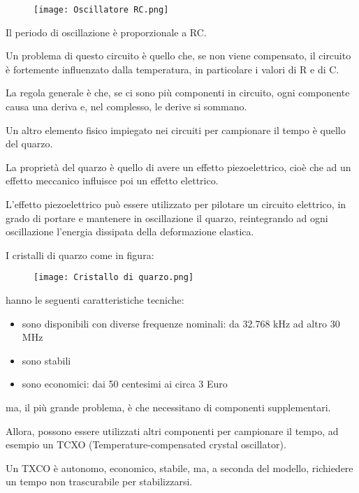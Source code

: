 \begin{figure}[h]
    \centering
    \texttt{[image: Oscillatore RC.png]}
\end{figure}

Il periodo di oscillazione è proporzionale a RC. \newline 

Un problema di questo circuito è quello che, se non viene compensato, 
il circuito è fortemente influenzato dalla temperatura, in particolare i valori di R e di C. \newline 

La regola generale è che, se ci sono più componenti in circuito, ogni componente causa una deriva e, nel complesso, 
le derive si sommano. \newline 

Un altro elemento fisico impiegato nei circuiti per campionare il tempo è quello del quarzo. \newline 

La proprietà del quarzo è quello di avere un effetto piezoelettrico, 
cioè che ad un effetto meccanico influisce poi un effetto elettrico. \newline 

L'effetto piezoelettrico può essere utilizzato per pilotare un circuito elettrico, 
in grado di portare e mantenere in oscillazione il quarzo, reintegrando ad ogni oscillazione l'energia dissipata della deformazione elastica. \newline 

I cristalli di quarzo come in figura: 

\begin{figure}[h]
    \centering
    \texttt{[image: Cristallo di quarzo.png]}
\end{figure}

hanno le seguenti caratteristiche tecniche: 

\begin{itemize}
    \item sono disponibili con diverse frequenze nominali: da 32.768 kHz ad altro 30 MHz 
    \item sono stabili 
    \item sono economici: dai 50 centesimi ai circa 3 Euro
\end{itemize}

ma, il più grande problema, è che necessitano di componenti supplementari. \newline 

Allora, possono essere utilizzati altri componenti per campionare il tempo, 
ad esempio un TCXO (Temperature-compensated crystal oscillator). \newline 

Un TXCO è autonomo, economico, stabile, ma, a seconda del modello, richiedere un tempo non trascurabile per stabilizzarsi. \newline 

\newpage 





